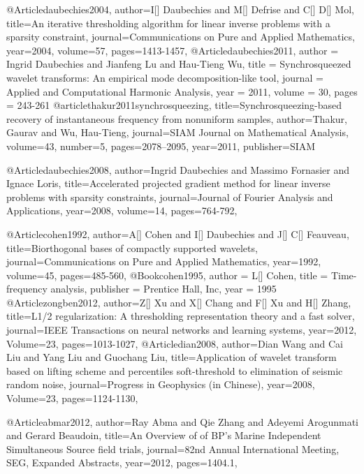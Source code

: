 @Article{daubechies2004,
  author={I[] Daubechies and M[] Defrise and C[] D[] Mol},
  title={An iterative thresholding algorithm for linear inverse problems with a sparsity constraint},
  journal={Communications on Pure and Applied Mathematics},
  year=2004,
  volume=57,
  pages={1413-1457},
}
@Article{daubechies2011,
  author = 	 {Ingrid Daubechies and Jianfeng Lu and Hau-Tieng Wu},
  title = 	 {Synchrosqueezed wavelet transforms: An empirical mode decomposition-like tool},
  journal = 	 {Applied and Computational Harmonic Analysis},
  year = 	 2011,
  volume = 	 30,
  pages = 	 {243-261}
}
@article{thakur2011synchrosqueezing,
  title={Synchrosqueezing-based recovery of instantaneous frequency from nonuniform samples},
  author={Thakur, Gaurav and Wu, Hau-Tieng},
  journal={SIAM Journal on Mathematical Analysis},
  volume={43},
  number={5},
  pages={2078--2095},
  year={2011},
  publisher={SIAM}
}


@Article{daubechies2008,
  author={Ingrid Daubechies and Massimo Fornasier and Ignace Loris},
  title={Accelerated projected gradient method for linear inverse problems with sparsity constraints},
  journal={Journal of Fourier Analysis and Applications},
  year=2008,
  volume=14,
  pages={764-792},
}

@Article{cohen1992,
  author={A[] Cohen and I[] Daubechies and J[] C[] Feauveau},
  title={Biorthogonal bases of compactly supported wavelets},
  journal={Communications on Pure and Applied Mathematics},
  year=1992,
  volume=45,
  pages={485-560},
}
@Book{cohen1995,
  author = 	 {L[] Cohen},
  title = 	 { Time-frequency analysis},
  publisher = 	 {Prentice Hall, Inc},
  year = 	 1995}
@Article{zongben2012,
  author={Z[] Xu and X[] Chang and F[] Xu and H[] Zhang},
  title={{L}1/2 regularization: A thresholding representation theory and a fast solver},
  journal={IEEE Transactions on neural networks and learning systems},
  year=2012,
  Volume=23,
  pages={1013-1027},
}
@Article{dian2008,
  author={Dian Wang and Cai Liu and Yang Liu and Guochang Liu},
  title={Application of wavelet transform based on lifting scheme and percentiles soft-threshold to elimination of seismic random noise},
  journal={Progress in Geophysics (in Chinese)},
  year=2008,
  Volume=23,
  pages={1124-1130},
}


@Article{abmar2012,
  author={Ray Abma and Qie Zhang and Adeyemi Arogunmati and Gerard Beaudoin},
  title={An Overview of of {BP}'s Marine Independent Simultaneous Source field trials},
  journal={82nd Annual International Meeting, SEG, Expanded Abstracts},
  year=2012,
  pages={1404.1},
}

